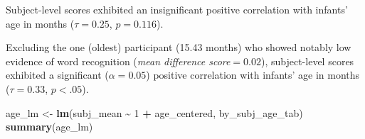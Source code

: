 \documentclass[
  doc,floatsintext]{apa6}
\newenvironment{Shaded}{\begin{snugshade}}{\end{snugshade}}
\newcommand{\AttributeTok}[1]{\textcolor[rgb]{0.13,0.29,0.53}{#1}}
\newcommand{\DecValTok}[1]{\textcolor[rgb]{0.00,0.00,0.81}{#1}}
\newcommand{\FunctionTok}[1]{\textcolor[rgb]{0.13,0.29,0.53}{\textbf{#1}}}
\newcommand{\NormalTok}[1]{#1}
\newcommand{\OtherTok}[1]{\textcolor[rgb]{0.56,0.35,0.01}{#1}}
\newcommand{\SpecialCharTok}[1]{\textcolor[rgb]{0.81,0.36,0.00}{\textbf{#1}}}
\newcommand{\StringTok}[1]{\textcolor[rgb]{0.31,0.60,0.02}{#1}}
\begin{document}
Subject-level scores exhibited an insignificant positive correlation with infants' age in months (\(\tau=0.25\), \(p=0.116\)).

\begin{Shaded}
\end{Shaded}

Excluding the one (oldest) participant (15.43 months) who showed notably low evidence of word recognition (\textit{mean difference score}\(=0.02\)), subject-level scores exhibited a significant (\(\alpha=0.05\)) positive correlation with infants' age in months (\(\tau=0.33\), \(p<.05\)).

\begin{Shaded}
\begin{Highlighting}[]
\NormalTok{age\_lm  }\OtherTok{\textless{}{-}} \FunctionTok{lm}\NormalTok{(subj\_mean }\SpecialCharTok{\textasciitilde{}} \DecValTok{1} \SpecialCharTok{+}\NormalTok{ age\_centered, by\_subj\_age\_tab)}
\FunctionTok{summary}\NormalTok{(age\_lm)}
\end{Highlighting}
\end{Shaded}
\end{document}
